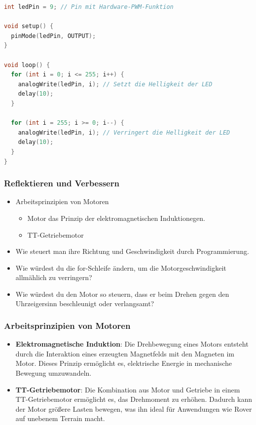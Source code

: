 \documentclass{vorlage-design-main}
\begin{document}
\begin{lstlisting}[language={C++}]
int ledPin = 9; // Pin mit Hardware-PWM-Funktion

void setup() {
  pinMode(ledPin, OUTPUT);
}

void loop() {
  for (int i = 0; i <= 255; i++) {
    analogWrite(ledPin, i); // Setzt die Helligkeit der LED
    delay(10);
  }
  
  for (int i = 255; i >= 0; i--) {
    analogWrite(ledPin, i); // Verringert die Helligkeit der LED
    delay(10);
  }
}
\end{lstlisting}

\hypertarget{reflektieren-und-verbessern}{%
\subsubsection{Reflektieren und
Verbessern}\label{reflektieren-und-verbessern}}

\begin{itemize}
\item
  Arbeitsprinzipien von Motoren

  \begin{itemize}
  
  \item
    Motor das Prinzip der elektromagnetischen Induktionegen.
  \item
    TT-Getriebemotor
  \end{itemize}
\item
  Wie steuert man ihre Richtung und Geschwindigkeit durch
  Programmierung.
\item
  Wie würdest du die for-Schleife ändern, um die Motorgeschwindigkeit
  allmählich zu verringern?
\item
  Wie würdest du den Motor so steuern, dass er beim Drehen gegen den
  Uhrzeigersinn beschleunigt oder verlangsamt?
\end{itemize}

\hypertarget{arbeitsprinzipien-von-motoren}{%
\subsubsection{Arbeitsprinzipien von
Motoren}\label{arbeitsprinzipien-von-motoren}}

\begin{itemize}

\item
  \textbf{Elektromagnetische Induktion}: Die Drehbewegung eines Motors
  entsteht durch die Interaktion eines erzeugten Magnetfelds mit den
  Magneten im Motor. Dieses Prinzip ermöglicht es, elektrische Energie
  in mechanische Bewegung umzuwandeln.
\item
  \textbf{TT-Getriebemotor}: Die Kombination aus Motor und Getriebe in
  einem TT-Getriebemotor ermöglicht es, das Drehmoment zu erhöhen.
  Dadurch kann der Motor größere Lasten bewegen, was ihn ideal für
  Anwendungen wie Rover auf unebenem Terrain macht.
\end{itemize}
\end{document}
